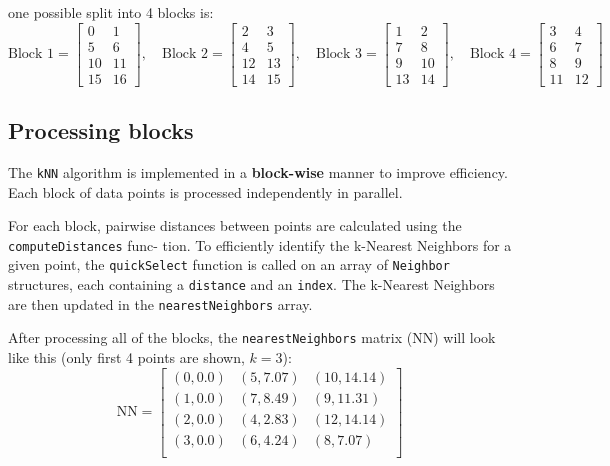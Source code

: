 \documentclass{article}
\begin{document}
one possible split into 4 blocks is:
\[
\text{Block 1} = \begin{bmatrix}
0 & 1 \\
5 & 6 \\
10 & 11 \\
15 & 16
\end{bmatrix}, \quad
\text{Block 2} = \begin{bmatrix}
2 & 3 \\
4 & 5 \\
12 & 13 \\
14 & 15
\end{bmatrix}, \quad
\text{Block 3} = \begin{bmatrix}
1 & 2 \\
7 & 8 \\
9 & 10 \\
13 & 14
\end{bmatrix}, \quad
\text{Block 4} = \begin{bmatrix}
3 & 4 \\
6 & 7 \\
8 & 9 \\
11 & 12
\end{bmatrix}
\]

\subsection{Processing blocks}
The \texttt{kNN} algorithm is implemented in a \textbf{block-wise} manner to improve efficiency. Each block of data
points is processed independently in parallel.

For each block, pairwise distances between points are calculated using the \texttt{computeDistances} func-
tion. To efficiently identify the k-Nearest Neighbors for a given point, the \texttt{quickSelect} function is called
on an array of \texttt{Neighbor} structures, each containing a \texttt{distance} and an \texttt{index}. The k-Nearest Neighbors
are then updated in the \texttt{nearestNeighbors} array.

After processing all of the blocks, the \texttt{nearestNeighbors} matrix (NN) will look like this (only first 4 points are shown, $k=3$):
\[
\text{NN} = \begin{bmatrix}
(0, 0.0) & (5, 7.07) & (10, 14.14) \\
(1, 0.0) & (7, 8.49) & (9, 11.31) \\
(2, 0.0) & (4, 2.83) & (12, 14.14) \\
(3, 0.0) & (6, 4.24) & (8, 7.07) \\
\end{bmatrix}
\]
\end{document}
